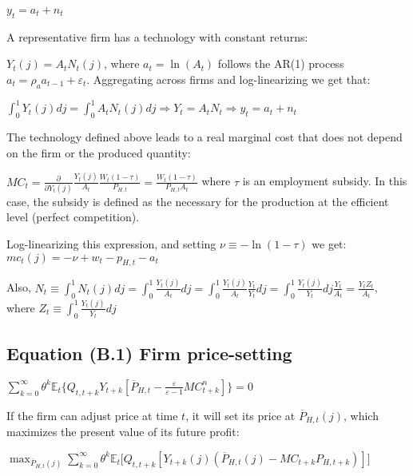\documentclass[
]{article}
\begin{document}
\(y_t=a_t+n_t\)

\vspace{8pt}

A representative firm has a technology with constant returns:

\(Y_t(j) = A_t N_t(j)\), where \(a_t = \ln(A_t)\) follows the AR(1)
process \(a_t = \rho_a a_{t-1} + \varepsilon_t\). Aggregating across
firms and log-linearizing we get that:

\(\displaystyle \int^1_0 Y_t(j) dj = \int^1_0 A_t N_t(j) dj \Rightarrow Y_t = A_t N_t \Rightarrow y_t = a_t + n_t\)

The technology defined above leads to a real marginal cost that does not
depend on the firm or the produced quantity:

\(\displaystyle MC_t = \frac{\partial}{\partial Y_t(j)} \frac{Y_t(j)}{A_t} \frac{W_t(1-\tau)}{P_{H,t}} =\frac{W_t(1-\tau)}{P_{H,t} A_t}\)
where \(\tau\) is an employment subsidy. In this case, the subsidy is
defined as the necessary for the production at the efficient level
(perfect competition).

Log-linearizing this expression, and setting \(\nu \equiv -\ln(1-\tau)\)
we get: \(mc_t(j) = -\nu + w_t - p_{H,t} - a_t\)

Also,
\(\displaystyle N_t \equiv \int_0^1 N_t(j)dj = \int_0^1\frac{Y_t(j)}{A_t}dj=\int_0^1\frac{Y_t(j)}{A_t}\frac{Y_t}{Y_t}dj=\int_0^1\frac{Y_t(j)}{Y_t}dj\frac{Y_t}{A_t}=\frac{Y_t Z_t}{A_t}\),
where \(\displaystyle Z_t \equiv \int_0^1\frac{Y_t(j)}{Y_t}dj\)

\vspace{12pt}

\hypertarget{equation-b.1-firm-price-setting}{%
\subsection{Equation (B.1) Firm
price-setting}\label{equation-b.1-firm-price-setting}}

\(\displaystyle \sum_{k=0}^\infty \theta^k\mathbb{E}_t \bigg\{ Q_{t,t+k} Y_{t+k } \left[ \overline{P}_{H,t}-\frac{\varepsilon}{\varepsilon-1} MC_{t+k}^n \right] \bigg\} = 0\)

\vspace{8pt}

If the firm can adjust price at time \(t\), it will set its price at
\(\overline P_{H,t} (j)\), which maximizes the present value of its
future profit:

\(\displaystyle \max_{\overline P_{H,t}(j)} \sum^\infty_{k=0} \theta^k \mathbb{E}_t \big[ Q_{t, t+k}[Y_{t+k}(j) (\overline P_{H,t}(j) - MC_{t+k} P_{H,t+k})] \big]\)
\end{document}

